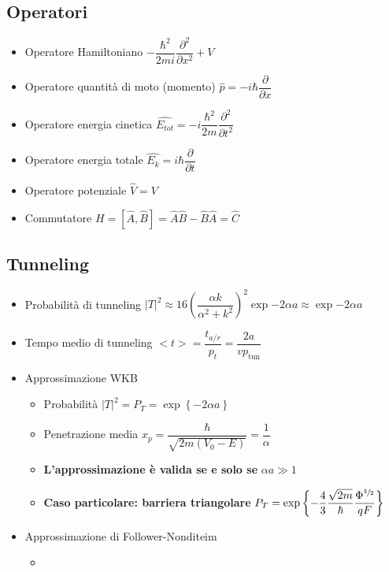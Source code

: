 \documentclass{article}
\begin{document}
\subsection{Operatori}
\begin{itemize}
	\item Operatore Hamiltoniano \( - \dfrac{\hbar ^ 2}{2mi} \dfrac{\partial ^ 2}{\partial x ^ 2} + V \)
	\item Operatore quantità di moto (momento) \( \hat{p} = -i \hbar \dfrac{\partial}{\partial x} \)
	\item Operatore energia cinetica \( \hat{E_{tot}} = -i \dfrac{\hbar ^ 2}{2m} \dfrac{\partial ^ 2}{\partial t ^ 2} \)
	\item Operatore energia totale \( \hat{E_k} = i \hbar \dfrac{\partial }{\partial t} \)
	\item Operatore potenziale \( \hat{V} = V \)
	\item Commutatore \( H = [\hat{A}, \hat{B}] = \hat{A}\hat{B} - \hat{B}\hat{A} = \hat{C} \)
\end{itemize}

\subsection{Tunneling}
\begin{itemize}
	\item Probabilità di tunneling \( \left| T \right| ^ 2 \approx 16 \left( \dfrac{\alpha k}{\alpha^2 + k^2} \right) ^ 2  \exp{-2 \alpha a} \approx \exp{-2 \alpha a} \)
	\item Tempo medio di tunneling \( <t> = \dfrac{t_{a/r}}{p_t} = \dfrac{2 a}{v p_{\text{tun}}} \)
	\item Approssimazione WKB
	\begin{itemize}
		\item Probabilità \( \left| T \right| ^ 2 = P_T = \exp{ \left\{ -2 \alpha a \right\} } \)
		\item Penetrazione media \( x_p = \dfrac{\hbar}{\sqrt{2 m (V_0 - E)}} = \dfrac{1}{\alpha} \)
		\item \textbf{L'approssimazione è valida se e solo se} \( \alpha a \gg 1 \)
		\item \textbf{Caso particolare: barriera triangolare} \( P_T = \exp\left\{ - \dfrac{4}{3} \dfrac{\sqrt{2 m}}{\hbar}  \dfrac{\Phi ^ {\sfrac{3}{2}}}{qF} \right\} \)
	\end{itemize}
	\item Approssimazione di Follower-Nonditeim
	\begin{itemize}
		\item 
	\end{itemize}		 
\end{itemize}
\end{document}

